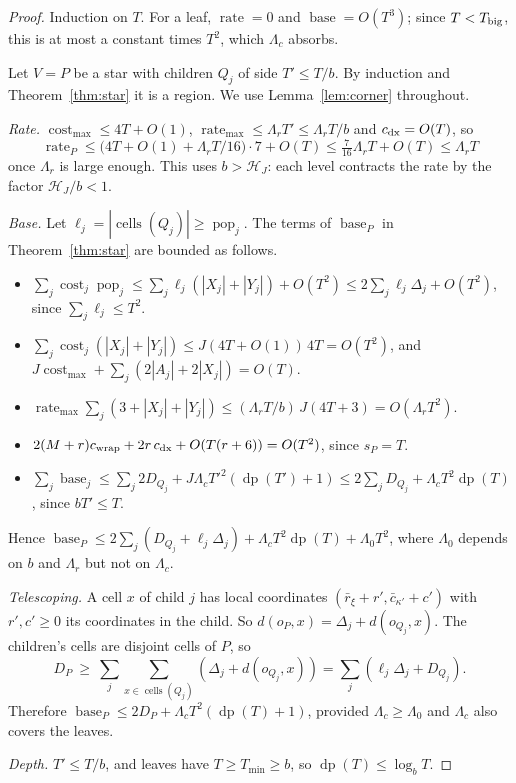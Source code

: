 \documentclass[11pt]{amsart}
\theoremstyle{definition}
\newcommand{\cells}{\operatorname{cells}}
\newcommand{\pop}{\operatorname{pop}}
\newcommand{\base}{\operatorname{base}}
\newcommand{\rate}{\operatorname{rate}}
\newcommand{\cost}{\operatorname{cost}}
\begin{document}
\begin{proof}
Induction on $T$. For a leaf, $\rate=0$ and $\base=O(T^3)$; since $T<T_{\rm big}$, this is at most a constant times $T^2$, which $\Lambda_c$ absorbs.

Let $V=P$ be a star with children $Q_j$ of side $T'\le T/b$. By induction and Theorem~\ref{thm:star} it is a
region. We use Lemma~\ref{lem:corner} throughout.

\emph{Rate.} $\cost_{\max}\le4T+O(1)$, $\rate_{\max}\le \Lambda_rT'\le \Lambda_rT/b$ and $c_{\rm dx}=O(T)$, so
\[
\rate_P\le\bigl(4T+O(1)+\Lambda_rT/16\bigr)\cdot7+O(T)\le\tfrac{7}{16}\Lambda_rT+O(T)\le \Lambda_rT
\]
once $\Lambda_r$ is large enough. This uses $b>\mathcal H_J$: each level contracts the rate by the factor $\mathcal H_J/b<1$.

\emph{Base.} Let $\ell_j=|\cells(Q_j)|\ge\pop_j$. The terms of $\base_P$ in Theorem~\ref{thm:star} are bounded as follows.
\begin{itemize}[nosep]
\item $\sum_j\cost_j\pop_j\le\sum_j\ell_j(|X_j|+|Y_j|)+O(T^2)\le2\sum_j\ell_j\Delta_j+O(T^2)$, since $\sum_j\ell_j\le T^2$.
\item $\sum_j\cost_j(|X_j|+|Y_j|)\le J(4T+O(1))\,4T=O(T^2)$, and $J\cost_{\max}+\sum_j(2|A_j|+2|X_j|)=O(T)$.
\item $\rate_{\max}\sum_j(3+|X_j|+|Y_j|)\le (\Lambda_rT/b)\,J(4T+3)=O(\Lambda_rT^2)$.
\item $2(M+r)c_{\rm wrap}+2r\,c_{\rm dx}+O(T(r+6))=O(T^2)$, since $s_P=T$.
\item $\sum_j\base_j\le\sum_j2D_{Q_j}+J\Lambda_cT'^2(\operatorname{dp}(T')+1)\le2\sum_jD_{Q_j}+\Lambda_cT^2\operatorname{dp}(T)$, since $bT'\le T$.
\end{itemize}
Hence $\base_P\le2\sum_j(D_{Q_j}+\ell_j\Delta_j)+\Lambda_cT^2\operatorname{dp}(T)+\Lambda_0T^2$, where $\Lambda_0$ depends on $b$ and $\Lambda_r$ but not
on $\Lambda_c$.

\emph{Telescoping.} A cell $x$ of child $j$ has local coordinates $(\bar r_\xi+r',\bar c_{\kappa'}+c')$ with $r',c'\ge0$ its
coordinates in the child. So $d(o_P,x)=\Delta_j+d(o_{Q_j},x)$. The children's cells are disjoint cells of $P$, so
\[
D_P\ \ge\ \sum_j\sum_{x\in\cells(Q_j)}(\Delta_j+d(o_{Q_j},x))=\sum_j(\ell_j\Delta_j+D_{Q_j}).
\]
Therefore $\base_P\le2D_P+\Lambda_cT^2(\operatorname{dp}(T)+1)$, provided $\Lambda_c\ge \Lambda_0$ and $\Lambda_c$ also covers the leaves.

\emph{Depth.} $T'\le T/b$, and leaves have $T\ge T_{\min}\ge b$, so $\operatorname{dp}(T)\le\log_bT$.
\end{proof}
\end{document}

